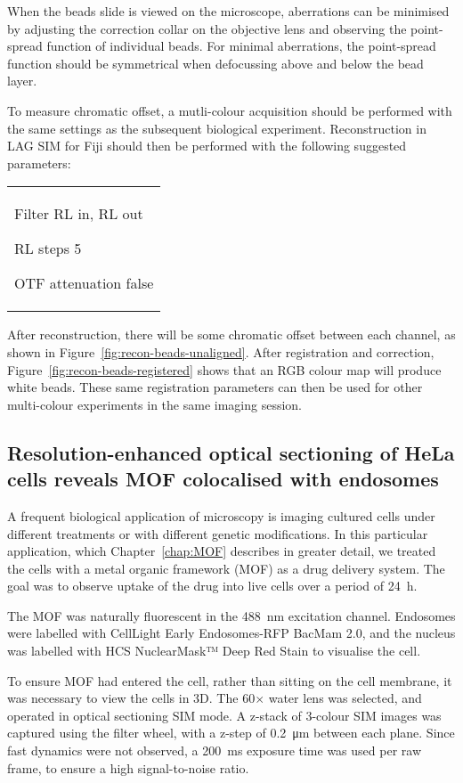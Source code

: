 When the beads slide is viewed on the microscope, aberrations can be minimised by adjusting the correction collar on the objective lens and observing the point-spread function of individual beads. 
For minimal aberrations, the point-spread function should be symmetrical when defocussing above and below the bead layer. 

To measure chromatic offset, a mutli-colour acquisition should be performed with the same settings as the subsequent biological experiment. 
Reconstruction in LAG SIM for Fiji should then be performed with the following suggested parameters: \newline
\begin{tabular}{p{}}
\begin{labelling}[margin=OTF attenuation]
	\item[Filter] RL in, RL out
	\item[RL steps] 5
	\item[OTF attenuation] false
\end{labelling}
\end{tabular}

After reconstruction, there will be some chromatic offset between each channel, as shown in Figure~\ref{fig:recon-beads-unaligned}. 
After registration and correction, Figure~\ref{fig:recon-beads-registered} shows that an RGB colour map will produce white beads. 
These same registration parameters can then be used for other multi-colour experiments in the same imaging session. 


\subsection{Resolution-enhanced optical sectioning of HeLa cells reveals MOF colocalised with endosomes}
A frequent biological application of microscopy is imaging cultured cells under different treatments or with different genetic modifications. 
In this particular application, which Chapter~\ref{chap:MOF} describes in greater detail, we treated the cells with a metal organic framework (MOF) as a drug delivery system. 
The goal was to observe uptake of the drug into live cells over a period of \SI{24}{\hour}. 

The MOF was naturally fluorescent in the \SI{488}{\nano\metre} excitation channel. 
Endosomes were labelled with CellLight Early Endosomes-RFP BacMam 2.0, and the nucleus was labelled with HCS NuclearMask™ Deep Red Stain to visualise the cell. 

To ensure MOF had entered the cell, rather than sitting on the cell membrane, it was necessary to view the cells in 3D. 
The 60$\times$ water lens was selected, and operated in optical sectioning SIM mode. 
A z-stack of 3-colour SIM images was captured using the filter wheel, with a z-step of \SI{0.2}{\micro\metre} between each plane. 
Since fast dynamics were not observed, a \SI{200}{\milli\second} exposure time was used per raw frame, to ensure a high signal-to-noise ratio. 

